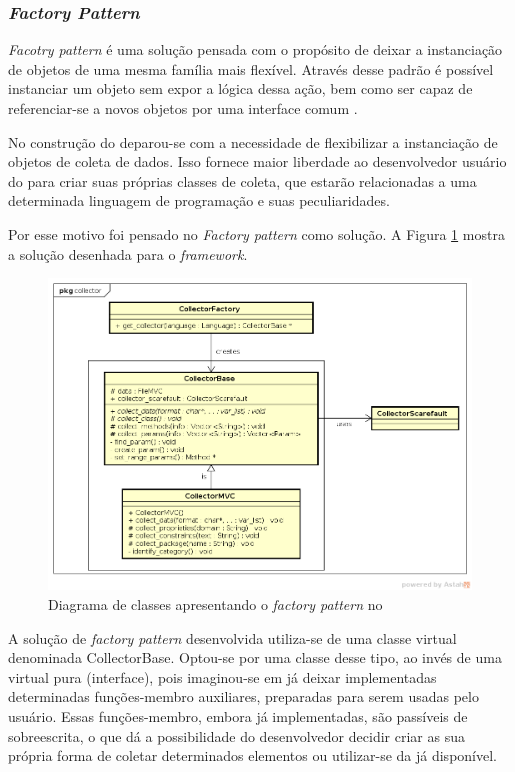 \subsubsection{\textit{Factory Pattern}} \label{subsec-factory-pattern}
\textit{Facotry pattern} é uma solução pensada com o propósito de deixar a
instanciação de objetos de uma mesma família mais flexível. Através desse
padrão  é possível instanciar um objeto sem expor a lógica dessa ação, bem
como ser capaz de referenciar-se a novos objetos por uma interface comum
\cite{gammaEtAl1994}.

No construção do \scarefault deparou-se com a necessidade de flexibilizar
a instanciação de objetos de coleta de dados. Isso fornece maior liberdade
ao desenvolvedor usuário do \framework para criar suas próprias classes de
coleta, que estarão relacionadas a uma determinada linguagem de programação
e suas peculiaridades.

Por esse motivo foi pensado no \textit{Factory pattern} como solução. A Figura
\ref{collector-diagram} mostra a solução desenhada para o \textit{framework}.
\begin{figure}[h]
  \centering
    \includegraphics[width=\textwidth]{figuras/collector-diagram.png}
    \caption{Diagrama de classes apresentando o \textit{factory pattern} no \framework}
    \label{collector-diagram}
\end{figure}
\FloatBarrier

A solução de \textit{factory pattern} desenvolvida utiliza-se de uma classe
\textsf{virtual} denominada \textsf{CollectorBase}. Optou-se por uma classe
desse tipo, ao invés de uma \textsf{virtual} pura (\textsf{interface}), pois
imaginou-se em já deixar implementadas determinadas funções-membro auxiliares,
preparadas para serem usadas pelo usuário. Essas funções-membro, embora já implementadas,
são passíveis de sobreescrita, o que dá a possibilidade do desenvolvedor
decidir criar as sua própria forma de coletar determinados elementos ou utilizar-se
da já disponível.

